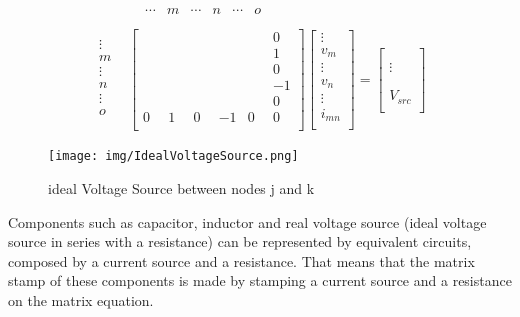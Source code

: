 \begin{equation}
\begin{split}	
	& 
	\begin{matrix}
		& \cdots & m & \cdots & n & \cdots & o \\[-6pt]
	\end{matrix}\\
	\begin{matrix}
		\vdots\\
		m\\
		\vdots\\
		n\\
		\vdots\\
		o\\
	\end{matrix}
	& 
	\begin{bmatrix}
		\quad & \quad & \quad & \quad & \quad & 0\\[6pt]
		& & & & & 1\\[6pt]
		& & & & & 0\\[6pt]
		& & & & & -1\\[6pt]
		& & & & & 0\\[6pt]
		0 & 1 & 0 & -1 & 0 & 0\\
	\end{bmatrix}
	\begin{bmatrix}
		\vdots \\
		v_m\\[6pt]
		\vdots \\
		v_n\\[6pt]
		\vdots\\
		i_{mn}\\
	\end{bmatrix}
	=
	\begin{bmatrix}
		\\[6pt]
		\\[6pt]
		\vdots\\[6pt]
		\\[6pt]
		\\[6pt]
		V_{src}\\
	\end{bmatrix}	
\end{split}
\end{equation}
%
\begin{figure}[h]
	\centering
	\texttt{[image: img/IdealVoltageSource.png]}
	\caption{ideal Voltage Source between nodes j and k}
	\label{fig:IdealVSource}
\end{figure}

Components such as capacitor, inductor and real voltage source (ideal voltage source in series with a resistance) can be represented by equivalent circuits, composed by a current source and a resistance. That means that the matrix stamp of these components is made by stamping a current source and a resistance on the matrix equation.

